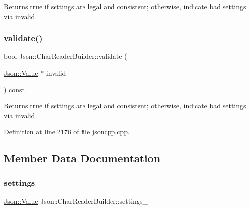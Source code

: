 \begin{DoxyReturn}{Returns}
true if \textquotesingle{}settings\textquotesingle{} are legal and consistent; otherwise, indicate bad settings via \textquotesingle{}invalid\textquotesingle{}. 
\end{DoxyReturn}
\hypertarget{class_json_1_1_char_reader_builder_af890b5cb70e9b372e41de5c9e6535d21}{}\label{class_json_1_1_char_reader_builder_af890b5cb70e9b372e41de5c9e6535d21} 
\subsubsection{\texorpdfstring{validate()}{validate()}\hspace{0.1cm}{\footnotesize\ttfamily [2/2]}}
{\footnotesize\ttfamily bool Json\+::\+Char\+Reader\+Builder\+::validate (\begin{DoxyParamCaption}\item[{\hyperlink{class_json_1_1_value}{Json\+::\+Value} $\ast$}]{invalid }\end{DoxyParamCaption}) const}

\begin{DoxyReturn}{Returns}
true if \textquotesingle{}settings\textquotesingle{} are legal and consistent; otherwise, indicate bad settings via \textquotesingle{}invalid\textquotesingle{}. 
\end{DoxyReturn}


Definition at line 2176 of file jsoncpp.\+cpp.



\subsection{Member Data Documentation}
\hypertarget{class_json_1_1_char_reader_builder_ac69b7911ad64c171c51ebaf2ea26d958}{}\label{class_json_1_1_char_reader_builder_ac69b7911ad64c171c51ebaf2ea26d958} 
\subsubsection{\texorpdfstring{settings\+\_\+}{settings\_}}
{\footnotesize\ttfamily \hyperlink{class_json_1_1_value}{Json\+::\+Value} Json\+::\+Char\+Reader\+Builder\+::settings\+\_\+}

